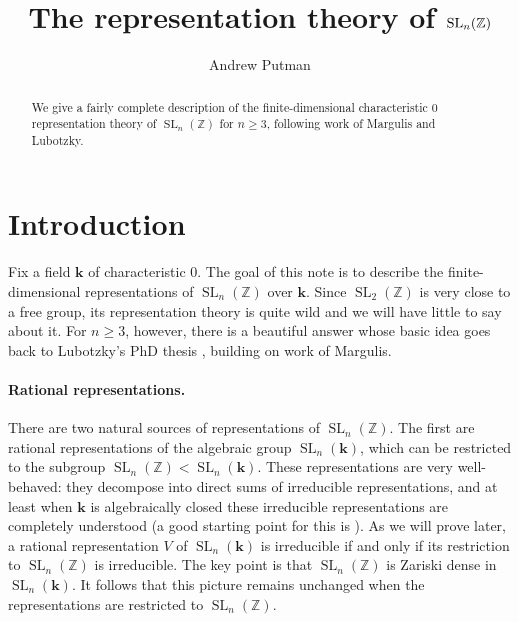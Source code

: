 \documentclass[11pt]{article}
\title{\vspace{-40pt}The representation theory of $\SL_n(\Z)$}
\author{Andrew Putman}
\date{}
\numberwithin{equation}{section}
\theoremstyle{plain}
\theoremstyle{definition}
\theoremstyle{remark}
\DeclareMathOperator{\SL}{SL}
\newcommand\Z{\ensuremath{\mathbb{Z}}}
\newcommand\bk{\ensuremath{\mathbf{k}}}
\begin{document}
\vspace{-10pt}
\maketitle

\vspace{-24pt}
\begin{abstract}
\noindent
We give a fairly complete description of the finite-dimensional characteristic $0$ representation theory of $\SL_n(\Z)$ for 
$n \geq 3$, following work of Margulis and Lubotzky.
\end{abstract}

\section{Introduction}

Fix a field $\bk$ of characteristic $0$.  The goal of this note is to describe the finite-dimensional
representations of $\SL_n(\Z)$ over $\bk$.  Since $\SL_2(\Z)$ is very close to a free group,
its representation theory is quite wild and we will have little to say about it.  For $n \geq 3$, however,
there is a beautiful answer whose basic idea goes back to Lubotzky's PhD thesis \cite{LubotzkyThesis}, building
on work of Margulis.

\paragraph{Rational representations.}
There are two natural sources of representations of $\SL_n(\Z)$.  The first are rational
representations of the algebraic group $\SL_n(\bk)$, which can be restricted to the subgroup
$\SL_n(\Z)<\SL_n(\bk)$.  These representations are very well-behaved: they decompose into
direct sums of irreducible representations, and at least when $\bk$ is algebraically closed
these irreducible representations are completely understood (a good starting point for
this is \cite{HumphreysBook}).  As we will prove later, a rational representation $V$ of
$\SL_n(\bk)$ is irreducible if and only if its restriction to $\SL_n(\Z)$ is irreducible.
The key point is that $\SL_n(\Z)$ is Zariski dense in $\SL_n(\bk)$.  It follows that this picture
remains unchanged when the representations are restricted to $\SL_n(\Z)$.
\end{document}
